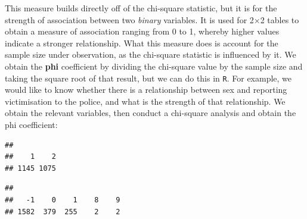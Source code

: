 \documentclass[
]{book}
\newenvironment{Shaded}{\begin{snugshade}}{\end{snugshade}}
\newcommand{\AttributeTok}[1]{\textcolor[rgb]{0.77,0.63,0.00}{#1}}
\newcommand{\CommentTok}[1]{\textcolor[rgb]{0.56,0.35,0.01}{\textit{#1}}}
\newcommand{\DecValTok}[1]{\textcolor[rgb]{0.00,0.00,0.81}{#1}}
\newcommand{\FunctionTok}[1]{\textcolor[rgb]{0.00,0.00,0.00}{#1}}
\newcommand{\NormalTok}[1]{#1}
\newcommand{\OtherTok}[1]{\textcolor[rgb]{0.56,0.35,0.01}{#1}}
\newcommand{\SpecialCharTok}[1]{\textcolor[rgb]{0.00,0.00,0.00}{#1}}
\newcommand{\StringTok}[1]{\textcolor[rgb]{0.31,0.60,0.02}{#1}}
\begin{document}
This measure builds directly off of the chi-square statistic, but it is for the strength of association between two \emph{binary} variables. It is used for 2×2 tables to obtain a measure of association ranging from 0 to 1, whereby higher values indicate a stronger relationship.
What this measure does is account for the sample size under observation, as the chi-square statistic is influenced by it. We obtain the \textbf{phi} coefficient by dividing the chi-square value by the sample size and taking the square root of that result, but we can do this in \texttt{R}. For example, we would like to know whether there is a relationship between sex and reporting victimisation to the police, and what is the strength of that relationship. We obtain the relevant variables, then conduct a chi-square analysis and obtain the phi coefficient:

\begin{Shaded}
\end{Shaded}

\begin{verbatim}
## 
##    1    2 
## 1145 1075
\end{verbatim}

\begin{Shaded}
\end{Shaded}

\begin{verbatim}
## 
##   -1    0    1    8    9 
## 1582  379  255    2    2
\end{verbatim}
\end{document}
